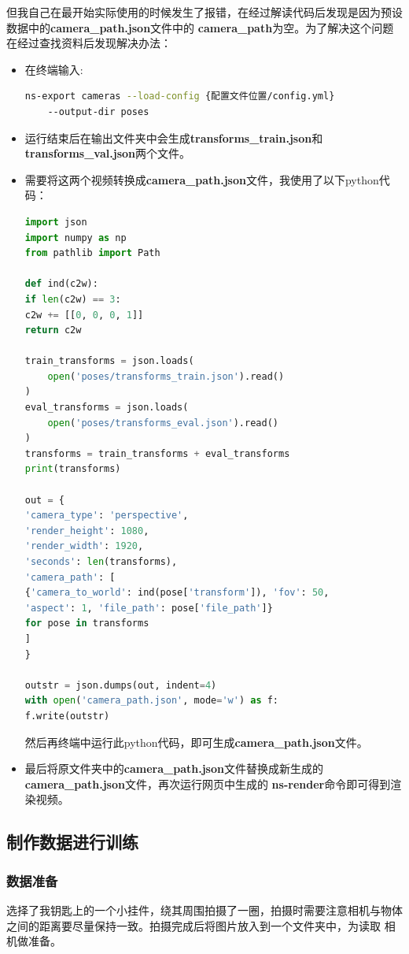 \documentclass{nwputhesis}
\begin{document}
\indent
但我自己在最开始实际使用的时候发生了报错，在经过解读代码后发现是因为预设数据中的\textbf{camera\_path.json}文件中的
\textbf{camera\_path}为空。为了解决这个问题在经过查找资料后发现解决办法：
\begin{itemize}
    \item 在终端输入:
    \begin{lstlisting}[language=bash]
    ns-export cameras --load-config {配置文件位置/config.yml} 
    --output-dir poses
    \end{lstlisting}
    \item 运行结束后在输出文件夹中会生成\textbf{transforms\_train.json}和\\
    \textbf{transforms\_val.json}两个文件。
    \item 需要将这两个视频转换成\textbf{camera\_path.json}文件，我使用了以下python代码：
    \begin{lstlisting}[language=python]
import json
import numpy as np
from pathlib import Path

def ind(c2w):
if len(c2w) == 3:
c2w += [[0, 0, 0, 1]]
return c2w

train_transforms = json.loads(
    open('poses/transforms_train.json').read()
)
eval_transforms = json.loads(
    open('poses/transforms_eval.json').read()
)
transforms = train_transforms + eval_transforms
print(transforms)

out = {
'camera_type': 'perspective',
'render_height': 1080,
'render_width': 1920,
'seconds': len(transforms),
'camera_path': [
{'camera_to_world': ind(pose['transform']), 'fov': 50, 
'aspect': 1, 'file_path': pose['file_path']}
for pose in transforms
]
}

outstr = json.dumps(out, indent=4)
with open('camera_path.json', mode='w') as f:
f.write(outstr)
\end{lstlisting}
然后再终端中运行此python代码，即可生成\textbf{camera\_path.json}文件。
\item 最后将原文件夹中的\textbf{camera\_path.json}文件替换成新生成的\textbf{camera\_path.json}文件，再次运行网页中生成的
\textbf{ns-render}命令即可得到渲染视频。
\end{itemize}
\subsection{制作数据进行训练}
\subsubsection{数据准备}
选择了我钥匙上的一个小挂件，绕其周围拍摄了一圈，拍摄时需要注意相机与物体之间的距离要尽量保持一致。拍摄完成后将图片放入到一个文件夹中，为读取
相机做准备。
\end{document}
